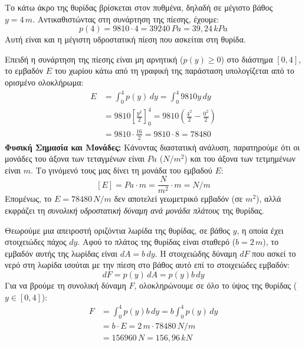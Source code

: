 \begin{alist}
\item Το κάτω άκρο της θυρίδας βρίσκεται στον πυθμένα, δηλαδή σε μέγιστο βάθος $y=4\,\si{m}$. Αντικαθιστώντας στη συνάρτηση της πίεσης, έχουμε:
\[p(4) = 9810 \cdot 4 = 39240\,\si{Pa} = 39{,}24\,\si{kPa}\]
Αυτή είναι και η μέγιστη υδροστατική πίεση που ασκείται στη θυρίδα.

\item Επειδή η συνάρτηση της πίεσης είναι μη αρνητική ($p(y) \ge 0$) στο διάστημα $[0,4]$, το εμβαδόν $E$ του χωρίου κάτω από τη γραφική της παράσταση υπολογίζεται από το ορισμένο ολοκλήρωμα:
\begin{align*}
    E &= \int_0^4 p(y)\,dy = \int_0^4 9810y\,dy \\
      &= 9810 \left[ \frac{y^2}{2} \right]_0^4 = 9810 \left( \frac{4^2}{2} - \frac{0^2}{2} \right) \\
      &= 9810 \cdot \frac{16}{2} = 9810 \cdot 8 = 78480
\end{align*}
\textbf{Φυσική Σημασία και Μονάδες:} Κάνοντας διαστατική ανάλυση, παρατηρούμε ότι οι μονάδες του άξονα των τεταγμένων είναι $\si{Pa}$ ($\si{N/m^2}$) και του άξονα των τετμημένων είναι $\si{m}$. Το γινόμενό τους μας δίνει τη μονάδα του εμβαδού $E$:
\[[E] = \si{Pa} \cdot \si{m} = \frac{\si{N}}{\si{m^2}} \cdot \si{m} = \si{N/m}\]
Επομένως, το $E = 78480\,\si{N/m}$ δεν αποτελεί γεωμετρικό εμβαδόν (σε $\si{m^2}$), αλλά εκφράζει τη \emph{συνολική υδροστατική δύναμη ανά μονάδα πλάτους} της θυρίδας.

\item Θεωρούμε μια απειροστή οριζόντια λωρίδα της θυρίδας, σε βάθος $y$, η οποία έχει στοιχειώδες πάχος $dy$. Αφού το πλάτος της θυρίδας είναι σταθερό ($b=2\,\si{m}$), το εμβαδόν αυτής της λωρίδας είναι $dA = b\,dy$. 
Η στοιχειώδης δύναμη $dF$ που ασκεί το νερό στη λωρίδα ισούται με την πίεση στο βάθος αυτό επί το στοιχειώδες εμβαδόν:
\[dF = p(y)\,dA = p(y)b\,dy\]
Για να βρούμε τη συνολική δύναμη $F$, ολοκληρώνουμε σε όλο το ύψος της θυρίδας ($y \in [0,4]$):
\begin{align*}
    F &= \int_0^4 p(y)b\,dy = b \int_0^4 p(y)\,dy \\
      &= b \cdot E = 2\,\si{m} \cdot 78480\,\si{N/m} \\
      &= 156960\,\si{N} = 156{,}96\,\si{kN}
\end{align*}


\end{alist}
